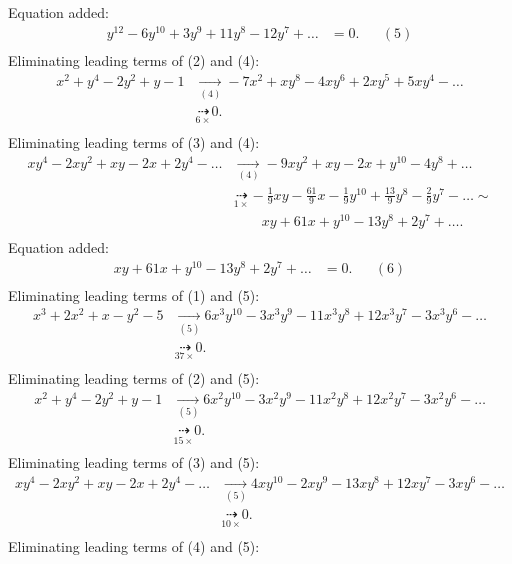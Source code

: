 {Equation added:
\begin{align*}
y^{12}-6y^{10}+3y^{9}+11y^{8}-12y^{7}+\ldots&= 0. &&(5)\\
\end{align*}
Eliminating leading terms of (2) and (4):
\begin{align*}
x^{2}+y^{4}-2y^{2}+y-1&\underset{(4)}{\rightarrow}-7x^{2}+xy^{8}-4xy^{6}+2xy^{5}+5xy^{4}-\ldots
\\ &\underset{6\times}{\dashrightarrow}0
.\\ \end{align*}
Eliminating leading terms of (3) and (4):
\begin{align*}
xy^{4}-2xy^{2}+xy-2x+2y^{4}-\ldots&\underset{(4)}{\rightarrow}-9xy^{2}+xy-2x+y^{10}-4y^{8}+\ldots
\\ &\underset{1\times}{\dashrightarrow}-\frac{1}{9}xy-\frac{61}{9}x-\frac{1}{9}y^{10}+\frac{13}{9}y^{8}-\frac{2}{9}y^{7}-\ldots
\sim \\ &\qquad xy+61x+y^{10}-13y^{8}+2y^{7}+\ldots
.\\ \end{align*}
Equation added:
\begin{align*}
xy+61x+y^{10}-13y^{8}+2y^{7}+\ldots&= 0. &&(6)\\
\end{align*}
Eliminating leading terms of (1) and (5):
\begin{align*}
x^{3}+2x^{2}+x-y^{2}-5&\underset{(5)}{\rightarrow}6x^{3}y^{10}-3x^{3}y^{9}-11x^{3}y^{8}+12x^{3}y^{7}-3x^{3}y^{6}-\ldots
\\ &\underset{37\times}{\dashrightarrow}0
.\\ \end{align*}
Eliminating leading terms of (2) and (5):
\begin{align*}
x^{2}+y^{4}-2y^{2}+y-1&\underset{(5)}{\rightarrow}6x^{2}y^{10}-3x^{2}y^{9}-11x^{2}y^{8}+12x^{2}y^{7}-3x^{2}y^{6}-\ldots
\\ &\underset{15\times}{\dashrightarrow}0
.\\ \end{align*}
Eliminating leading terms of (3) and (5):
\begin{align*}
xy^{4}-2xy^{2}+xy-2x+2y^{4}-\ldots&\underset{(5)}{\rightarrow}4xy^{10}-2xy^{9}-13xy^{8}+12xy^{7}-3xy^{6}-\ldots
\\ &\underset{10\times}{\dashrightarrow}0
.\\ \end{align*}
Eliminating leading terms of (4) and (5):
\begin{align*}

\end{align*}}
